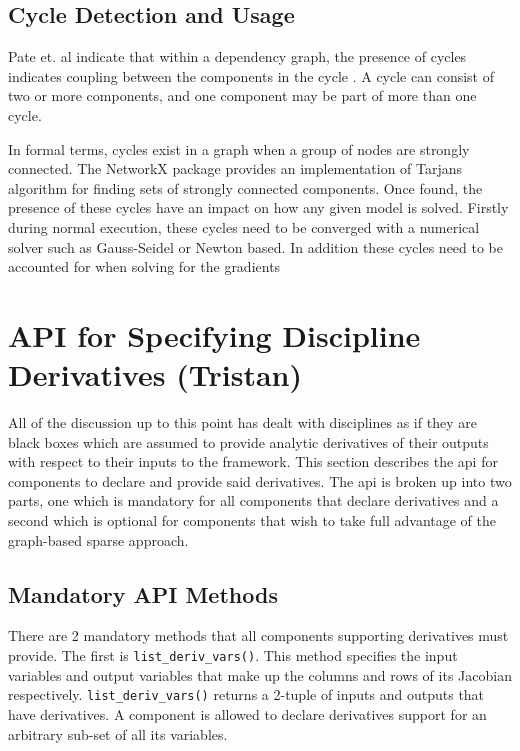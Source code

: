 \documentclass[]{aiaa-tc} %
\begin{document}
    \subsection{Cycle Detection and Usage}
        Pate et. al indicate that within a dependency graph, the presence of cycles indicates coupling between
        the components in the cycle \cite{graph_problem2013}. A cycle can consist of two or more components, and
        one component may be part of more than one cycle.

        In formal terms, cycles exist in a graph when a group of nodes are strongly connected. The NetworkX package
        provides an implementation of Tarjans algorithm for finding sets of strongly connected
        components\cite{tarjan1972depth,nuutila1994finding}. Once found, the presence of these cycles
        have an impact on how any given model is solved. Firstly during normal execution, these cycles
        need to be converged with a numerical solver such as Gauss-Seidel or Newton based.
        In addition these cycles need to be accounted for when solving for the gradients


    \section{API for Specifying Discipline Derivatives (Tristan)}

        All of the discussion up to this point has dealt with disciplines as if they are black boxes
        which are assumed to provide analytic derivatives of their outputs with respect to their inputs
        to the framework. This section describes the api for components to declare and provide
        said derivatives. The api is broken up into two parts, one which is mandatory for all components
        that declare derivatives and a second which is optional for components that wish to take full
        advantage of the graph-based sparse approach.

        \subsection{Mandatory API Methods}

        There are 2 mandatory methods that all components supporting derivatives must provide.
        The first is \texttt{list\_deriv\_vars()}. This method specifies the
        input variables and output variables that make up the columns and rows of its Jacobian respectively.
        \texttt{list\_deriv\_vars()} returns a 2-tuple of inputs and outputs that have derivatives.
        A component is allowed to declare derivatives support for an arbitrary sub-set of all its variables.
\end{document}
